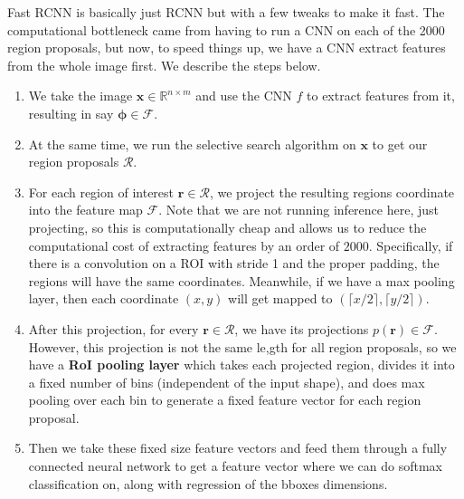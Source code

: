 \documentclass{article}
\begin{document}
    Fast RCNN is basically just RCNN but with a few tweaks to make it fast. The computational bottleneck came from having to run a CNN on each of the 2000 region proposals, but now, to speed things up, we have a CNN extract features from the whole image first. We describe the steps below. 
    \begin{enumerate} 
      \item We take the image $\mathbf{x} \in \mathbb{R}^{n \times m}$ and use the CNN $f$ to extract features from it, resulting in say $\boldsymbol{\phi} \in \mathcal{F}$.
      \item At the same time, we run the selective search algorithm on $\mathbf{x}$ to get our region proposals $\mathcal{R}$. 
      \item For each region of interest $\mathbf{r} \in \mathcal{R}$, we project the resulting regions coordinate into the feature map $\mathcal{F}$. Note that we are not running inference here, just projecting, so this is computationally cheap and allows us to reduce the computational cost of extracting features by an order of $2000$. Specifically, if there is a convolution on a ROI with stride 1 and the proper padding, the regions will have the same coordinates. Meanwhile, if we have a max pooling layer, then each coordinate $(x, y)$ will get mapped to $(\lceil x/2 \rceil, \lceil y/2 \rceil)$. 
      \item After this projection, for every $\mathbf{r} \in \mathcal{R}$, we have its projections $p(\mathbf{r}) \in \mathcal{F}$. However, this projection is not the same le,gth for all region proposals, so we have a \textbf{RoI pooling layer} which takes each projected region, divides it into a fixed number of bins (independent of the input shape), and does max pooling over each bin to generate a fixed feature vector for each region proposal.
      \begin{center}
      \end{center}
      \item Then we take these fixed size feature vectors and feed them through a fully connected neural network to get a feature vector where we can do softmax classification on, along with regression of the bboxes dimensions. 
    \end{enumerate}

    \begin{center}
    \end{center}
\end{document}
